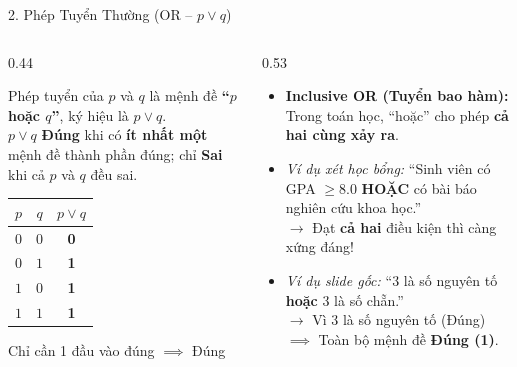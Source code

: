 \documentclass[aspectratio=169, 10pt]{beamer}
\begin{document}
\begin{frame}{2. Phép Tuyển Thường (OR -- $p \lor q$)}
  \begin{columns}[t, onlytextwidth]
    \begin{column}{0.44\textwidth}
      \begin{cozyDef}
        \small
        Phép tuyển của $p$ và $q$ là mệnh đề \textbf{``$p$ hoặc $q$''}, ký hiệu là $p \lor q$.\\
        \vspace{0.05cm}
        $p \lor q$ \textbf{\textcolor{cozyTrue}{Đúng}} khi có \textbf{ít nhất một} mệnh đề thành phần đúng; chỉ \textbf{\textcolor{cozyFalse}{Sai}} khi cả $p$ và $q$ đều sai.
        \vspace{0.15cm}
        \begin{center}
          \renewcommand{\arraystretch}{1.1}
          \begin{tabular}{cc|c}
            \toprule
            $p$ & $q$ & $p \lor q$ \\
            \midrule
            $0$ & $0$ & \textbf{\textcolor{cozyFalse}{0}} \\
            $0$ & $1$ & \textbf{\textcolor{cozyTrue}{1}} \\
            $1$ & $0$ & \textbf{\textcolor{cozyTrue}{1}} \\
            $1$ & $1$ & \textbf{\textcolor{cozyTrue}{1}} \\
            \bottomrule
          \end{tabular}
        \end{center}
        \vspace{0.05cm}
        \par\footnotesize\centering\color{cozyMuted}Chỉ cần 1 đầu vào đúng $\implies$ Đúng
      \end{cozyDef}
    \end{column}
    \begin{column}{0.53\textwidth}
      \begin{cozyInsight}
        \small
        \begin{itemize}
          \setlength{\itemsep}{3pt}
          \item \textbf{Inclusive OR (Tuyển bao hàm):} Trong toán học, ``hoặc'' cho phép \textbf{cả hai cùng xảy ra}.
          \item \textit{Ví dụ xét học bổng:} ``Sinh viên có GPA $\ge 8.0$ \textbf{HOẶC} có bài báo nghiên cứu khoa học.''\\
          $\to$ Đạt \textbf{cả hai} điều kiện thì càng xứng đáng!
          \item \textit{Ví dụ slide gốc:} ``$3$ là số nguyên tố \textbf{hoặc} $3$ là số chẵn.''\\
          $\to$ Vì $3$ là số nguyên tố (Đúng) $\implies$ Toàn bộ mệnh đề \textbf{\textcolor{cozyTrue}{Đúng (1)}}.
        \end{itemize}
      \end{cozyInsight}
    \end{column}
  \end{columns}
\end{frame}
\end{document}
